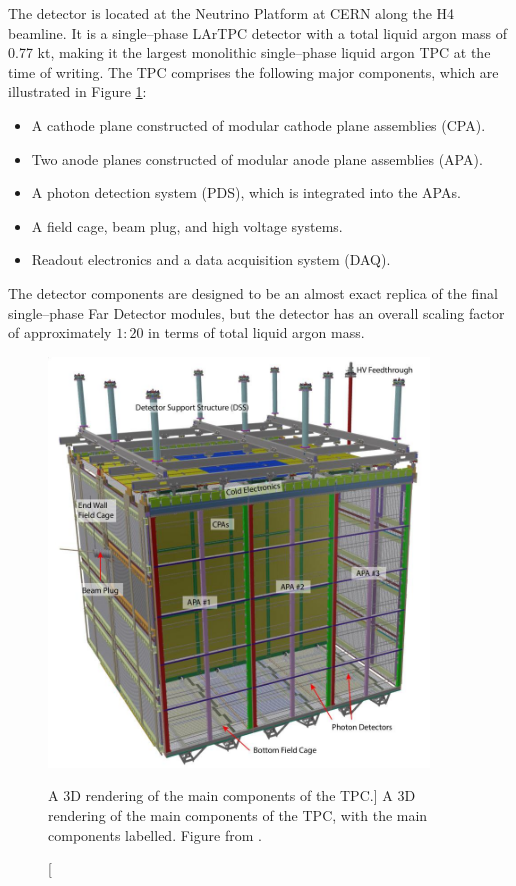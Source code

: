 The \protodune{} detector is located at the Neutrino Platform at CERN along the
H4 beamline. It is a single--phase LArTPC detector with a total liquid argon 
mass of 0.77 kt, making it the largest monolithic single--phase liquid argon TPC
at the time of writing. The TPC comprises the following major components, which 
are illustrated in Figure \ref{fig:pdsp_tpc}:
\begin{itemize}[noitemsep, topsep=2pt]
	\item A cathode plane constructed of modular cathode plane assemblies (CPA).
	\item Two anode planes constructed of modular anode plane assemblies (APA).
	\item A photon detection system (PDS), which is integrated into the APAs.
	\item A field cage, beam plug, and high voltage systems.
	\item Readout electronics and a data acquisition system (DAQ).
\end{itemize}
The detector components are designed to be an almost exact replica of the final 
single--phase Far Detector modules, but the detector has an overall scaling 
factor of approximately $1:20$ in terms of total liquid argon 
mass\cite{Abi:2017aow}.

\begin{figure}

	\centering

	\includegraphics[width=0.9\textwidth]{figures/pdsp_tpc.jpg}

	\caption
	[A 3D rendering of the main components of the \protodune{} TPC.]
	{A 3D rendering of the main components of the \protodune{} TPC, with the main
	components labelled. Figure from \cite{Abi:2017aow}.}

	\label{fig:pdsp_tpc}

\end{figure}

